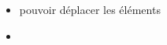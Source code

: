\documentclass{article}
\begin{document}
\begin{itemize}
    \item pouvoir déplacer les éléments
    \item 
\end{itemize}
\end{document}
